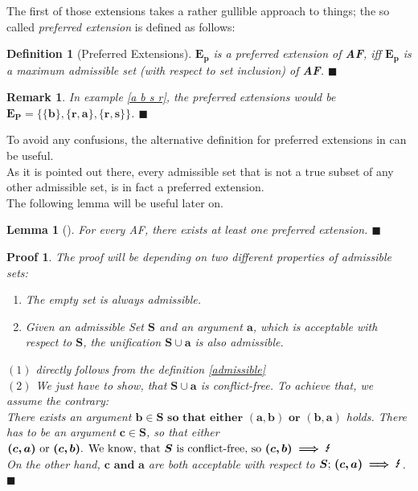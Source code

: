 \documentclass[12pt]{report}
\numberwithin{figure}{chapter}
\theoremstyle{break}
\newtheorem{defn}{Definition}[chapter]
\newtheorem{lem}{Lemma}[chapter]
\newtheorem*{prf}{Proof}
\newtheorem*{rmrk}{Remark}
\newenvironment{mydefn}{\begin{defn}}{$\blacksquare$ \end{defn}}
\newenvironment{mylem}{\begin{lem}}{$\blacksquare$ \end{lem}}
\newenvironment{myprf}{\begin{prf}}{$\blacksquare$ \end{prf}}
\newenvironment{myrmrk}{\begin{rmrk}}{$\blacksquare$ \end{rmrk}}
\begin{document}
The first of those extensions takes a rather gullible approach to things; the so called \textit{preferred extension} is defined as follows:

\begin{mydefn}[Preferred Extensions]
$\bm{E_{p}}$ is a preferred extension of \textbf{AF}, iff $\bm{E_{p}}$ is a maximum admissible set (with respect to set inclusion) of \textbf{AF}.
\end{mydefn}

\begin{myrmrk}
In example \ref{a b s r}, the preferred extensions would be $\bm{E_{P} = \{\{b\},\{r,a\},\{r,s\}\}}$.
\end{myrmrk}

To avoid any confusions, the alternative definition for preferred extensions in \cite{Egly} can be useful.\\
As it is pointed out there, every admissible set that is not a true subset of any other admissible set, is in fact a preferred extension.\\
The following lemma will be useful later on.
\begin{mylem}[\cite{Dung}]
For every AF, there exists at least one preferred extension.
\end{mylem}

\begin{myprf}
The proof will be depending on two different properties of admissible sets:
\begin{enumerate}
	\item{The empty set is always admissible.}
	\item{Given an admissible Set $\bm{S}$ and an argument $\bm{a}$, which is acceptable with respect to $\bm{S}$, the unification $\bm{S \cup a}$ is also admissible.}
\end{enumerate}
$(1)$ directly follows from the definition \ref{admissible}\\
$(2)$ We just have to show, that $\bm{S \cup a}$ is conflict-free. To achieve that, we assume the contrary:\\ 
There exists an argument $\bm{b \in S \text{ so that either } (a,b) \text{ or } (b,a)}$ holds.
There has to be an argument $\bm{c \in S}$, so that either $\bm{(c,a) \text{ or } (c,b) \text{. We know, that } S \text{ is conflict-free, so } (c,b) \implies \text{\Lightning}}$\\
On the other hand, $\bm{c \text{ and } a}$ are both acceptable with respect to $\bm{S \text{; } (c,a) \implies \text{\Lightning}}$.  
\end{myprf}
\end{document}
